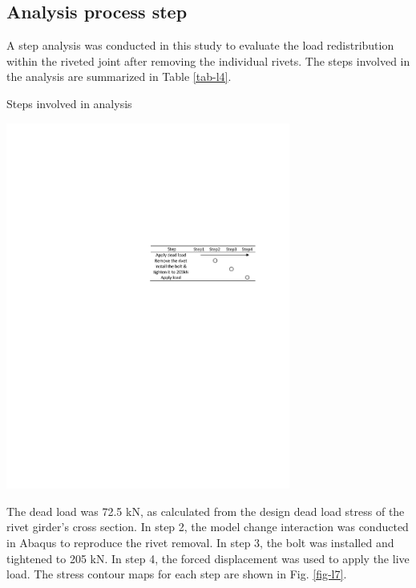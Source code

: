 \subsection{Analysis process step}

A step analysis was conducted in this study to evaluate the load redistribution within the riveted joint after removing the individual rivets. The steps involved in the analysis are summarized in Table \ref{tab-l4}.

\begin{table}[htbp]
    \centering
    \caption{Steps involved in analysis}\label{tab-l4}
    \includegraphics[width=0.7\textwidth]{imgs/ch4/tab-l4.pdf}
\end{table}

The dead load was 72.5 kN, as calculated from the design dead load stress of the rivet girder's cross section. In step 2, the model change interaction was conducted in Abaqus to reproduce the rivet removal. In step 3, the bolt was installed and tightened to 205 kN. In step 4, the forced displacement was used to apply the live load. The stress contour maps for each step are shown in Fig. \ref{fig-l7}.


